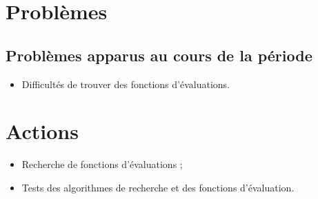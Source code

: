 \documentclass[a4paper]{article}
\begin{document}
\section*{Problèmes}
	\subsection*{Problèmes apparus au cours de la période}
		\begin{itemize}
			\item Difficultés de trouver des fonctions d'évaluations.
		\end{itemize}

\section*{Actions}
	\begin{itemize}
		\item Recherche de fonctions d'évaluations ;
		\item Tests des algorithmes de recherche et des fonctions d'évaluation.
	\end{itemize}
\end{document}
